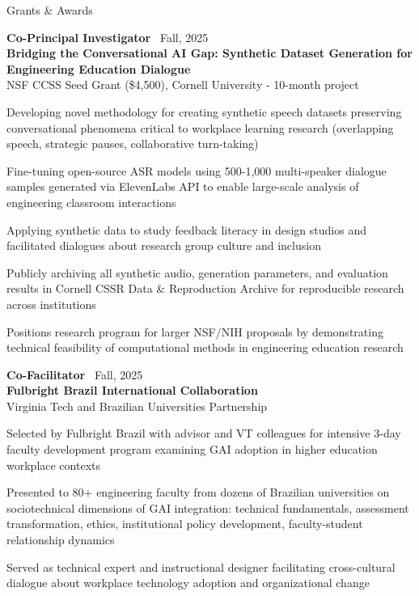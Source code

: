 \documentclass{resume}
\begin{document}
\begin{rSection}{Grants \& Awards}

{\bf Co-Principal Investigator} \hfill {\ Fall, 2025}\\
\textbf{Bridging the Conversational AI Gap: Synthetic Dataset Generation for Engineering Education Dialogue}\\
NSF CCSS Seed Grant (\$4,500), Cornell University - 10-month project
\begin{cvitems}
    \item Developing novel methodology for creating synthetic speech datasets preserving conversational phenomena critical to workplace learning research (overlapping speech, strategic pauses, collaborative turn-taking)
    \item Fine-tuning open-source ASR models using 500-1,000 multi-speaker dialogue samples generated via ElevenLabs API to enable large-scale analysis of engineering classroom interactions
    \item Applying synthetic data to study feedback literacy in design studios and facilitated dialogues about research group culture and inclusion
    \item Publicly archiving all synthetic audio, generation parameters, and evaluation results in Cornell CSSR Data \& Reproduction Archive for reproducible research across institutions
    \item Positions research program for larger NSF/NIH proposals by demonstrating technical feasibility of computational methods in engineering education research
\end{cvitems}


{\bf Co-Facilitator} \hfill {\ Fall, 2025}\\
\textbf{Fulbright Brazil International Collaboration}\\
Virginia Tech and Brazilian Universities Partnership
\begin{cvitems}
    \item Selected by Fulbright Brazil with advisor and VT colleagues for intensive 3-day faculty development program examining GAI adoption in higher education workplace contexts
    \item Presented to 80+ engineering faculty from dozens of Brazilian universities on sociotechnical dimensions of GAI integration: technical fundamentals, assessment transformation, ethics, institutional policy development, faculty-student relationship dynamics
    \item Served as technical expert and instructional designer facilitating cross-cultural dialogue about workplace technology adoption and organizational change
\end{cvitems}


\end{rSection}
\end{document}
